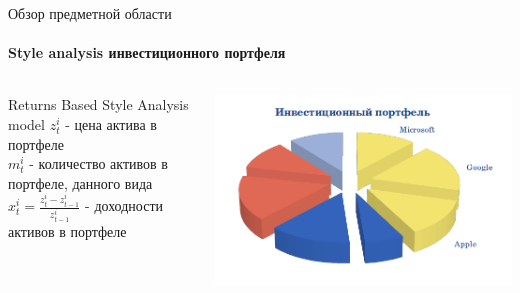 \documentclass[11pt]{beamer}
\begin{document}
\begin{frame}{Обзор предметной области}
\framesubtitle{Style analysis инвестиционного портфеля}
\begin{columns}[T]
    \begin{column}{.5\textwidth}
     \begin{block}{Returns Based Style Analysis model}
		$z_t^i$ - цена актива в портфеле\\
		$m_t^i$ - количество активов в портфеле, данного вида\\
		$x_t^i = \frac{z_t^i - z_{t-1}^i}{z_{t-1}^i}$ - доходности активов в портфеле\\
    \end{block}
    \end{column}
    \begin{column}{.5\textwidth}
   	 \includegraphics[width=\textwidth]{pic1.png}
    \end{column}
  \end{columns}
\end{frame}
	
\end{document}
